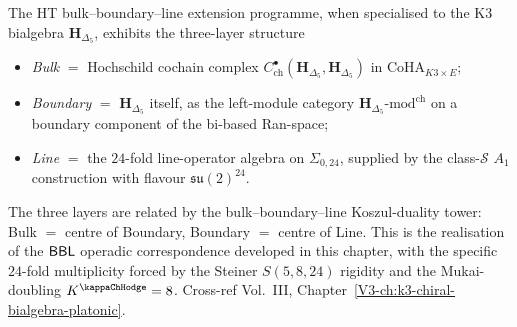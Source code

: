 \begin{remark}
\label{rem:ht-bbl-ext-1}
The HT bulk--boundary--line extension programme, when specialised to
the K3 bialgebra $\mathbf H_{\Delta_5}$, exhibits the
three-layer structure
\begin{itemize}
\item \emph{Bulk} $=$ Hochschild cochain complex
 $C^\bullet_{\mathrm{ch}}(\mathbf H_{\Delta_5}, \mathbf H_{\Delta_5})$
 in $\mathrm{CoHA}_{K3\times E}$;
\item \emph{Boundary} $=$ $\mathbf H_{\Delta_5}$ itself, as the
 left-module category $\mathbf H_{\Delta_5}\text{-}\mathrm{mod}^{\mathrm{ch}}$
 on a boundary component of the bi-based Ran-space;
\item \emph{Line} $=$ the $24$-fold line-operator algebra on
 $\Sigma_{0,24}$, supplied by the class-$\mathcal S$ $A_1$
 construction with flavour $\mathfrak{su}(2)^{24}$.
\end{itemize}
The three layers are related by the bulk--boundary--line
Koszul-duality tower: Bulk $=$ centre of Boundary, Boundary $=$ centre
of Line. This is the realisation of the ${\sf BBL}$ operadic
correspondence developed in this chapter, with the specific $24$-fold
multiplicity forced by the Steiner $S(5,8,24)$ rigidity and the
Mukai-doubling $K^{\kappaChHodge} = 8$. Cross-ref Vol.~III,
Chapter~\ref{V3-ch:k3-chiral-bialgebra-platonic}.
\end{remark}
